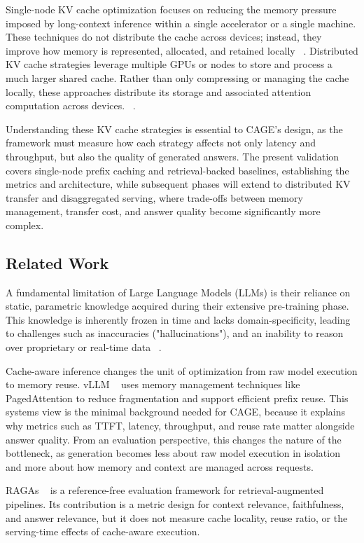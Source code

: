 \documentclass[12pt,a4paper]{article}
\let\cite\citep
\begin{document}
Single-node KV cache optimization focuses on reducing the memory pressure imposed by long-context inference within a single accelerator or a single machine. These techniques do not distribute the cache across devices; instead, they improve how memory is represented, allocated, and retained locally ~\cite{javidnia2025kvccompress}. Distributed KV cache strategies leverage multiple GPUs or nodes to store and process a much larger shared cache. Rather than only compressing or managing the cache locally, these approaches distribute its storage and associated attention computation across devices. ~\cite{qin2024mooncake}.

Understanding these KV cache strategies is essential to CAGE's design, as the framework must measure how each strategy affects not only latency and throughput, but also the quality of generated answers. The present validation covers single-node prefix caching and retrieval-backed baselines, establishing the metrics and architecture, while subsequent phases will extend to distributed KV transfer and disaggregated serving, where trade-offs between memory management, transfer cost, and answer quality become significantly more complex.

\subsection{Related Work}
A fundamental limitation of Large Language Models (LLMs) is their reliance on static, parametric knowledge acquired during their extensive pre-training phase. This knowledge is inherently frozen in time and lacks domain-specificity, leading to challenges such as  inaccuracies ("hallucinations"), and an inability to reason over proprietary or real-time data ~\cite{zhang2024siren, phillips2024seven}.

Cache-aware inference changes the unit of optimization from raw model execution to memory reuse. vLLM ~\cite{kwon2023efficient} uses memory management techniques like PagedAttention to reduce fragmentation and support efficient prefix reuse. This systems view is the minimal background needed for CAGE, because it explains why metrics such as TTFT, latency, throughput, and reuse rate matter alongside answer quality. From an evaluation perspective, this changes the nature of the bottleneck, as generation becomes less about raw model execution in isolation and more about how memory and context are managed across requests.

RAGAs ~\cite{espejel2023ragas} is a reference-free evaluation framework for retrieval-augmented pipelines. Its contribution is a metric design for context relevance, faithfulness, and answer relevance, but it does not measure cache locality, reuse ratio, or the serving-time effects of cache-aware execution.
\end{document}
